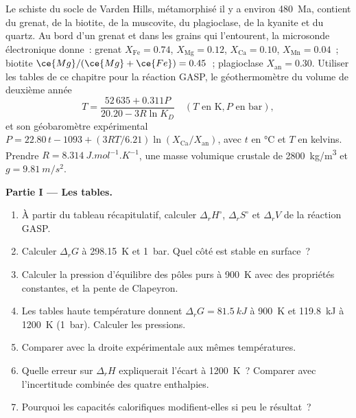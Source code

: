 \begin{problem}
\label{pb:b3:petrological-thermodynamics:1}
Le schiste du socle de Varden Hills, métamorphisé il y a environ
\qty{480}{Ma}, contient du grenat, de la biotite, de la muscovite, du plagioclase, de la kyanite et
du quartz. Au bord d'un grenat et dans les grains qui l'entourent, la microsonde électronique
donne~: grenat $X_{\text{Fe}} = 0.74$, $X_{\text{Mg}} = 0.12$, $X_{\text{Ca}} =
0.10$, $X_{\text{Mn}} = 0.04$~; biotite $\ce{Mg}/(\ce{Mg} + \ce{Fe}) = 0.45$~;
plagioclase $X_{\text{an}} = 0.30$. Utiliser les tables de ce chapitre pour la
réaction GASP, le géothermomètre du volume de deuxième année
\[
T = \frac{52\,635 + 0.311P}{20.20 - 3R\ln K_D}\quad(T \text{ en K}, P
\text{ en bar}),
\]
et son géobaromètre expérimental $P = 22.80\,t - 1093 + (3RT/6.21)\ln
(X_{\text{Ca}}/X_{\text{an}})$, avec $t$ en \unit{\celsius} et $T$ en
kelvins. Prendre $R = \qty{8.314}{J.mol^{-1}.K^{-1}}$, une masse volumique crustale de
\qty{2800}{kg/m^3} et $g = \qty{9.81}{m/s^2}$.

\medskip\noindent\textbf{Partie I --- Les tables.}
\begin{enumerate}
  \item À partir du tableau récapitulatif, calculer $\Delta_rH^\circ$, $\Delta_rS^\circ$
        et $\Delta_rV$ de la réaction GASP.
  \item Calculer $\Delta_rG$ à \qty{298.15}{K} et \qty{1}{bar}. Quel côté
        est stable en surface~?
  \item Calculer la pression d'équilibre des pôles purs à \qty{900}{K} avec
        des propriétés constantes, et la pente de Clapeyron.
  \item Les tables haute température donnent $\Delta_rG = \qty{81.5}{kJ}$ à
        \qty{900}{K} et \qty{119.8}{kJ} à \qty{1200}{K} (\qty{1}{bar}).
        Calculer les pressions.
  \item Comparer avec la droite expérimentale aux mêmes températures.
  \item Quelle erreur sur $\Delta_rH$ expliquerait l'écart à \qty{1200}{K}~?
        Comparer avec l'incertitude combinée des quatre enthalpies.
  \item Pourquoi les capacités calorifiques modifient-elles si peu le résultat~?
\end{enumerate}


\end{problem}
